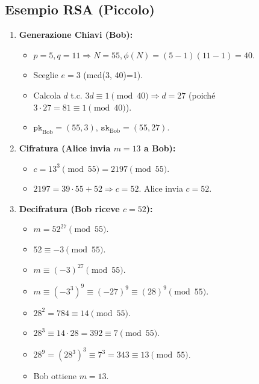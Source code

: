 \subsection{Esempio RSA (Piccolo)}
\begin{enumerate}
    \item \textbf{Generazione Chiavi (Bob):}
    \begin{itemize}
        \item $p=5, q=11 \Rightarrow N = 55, \phi(N) = (5-1)(11-1) = 40$.
        \item Sceglie $e=3$ (mcd(3, 40)=1).
        \item Calcola $d$ t.c. $3d \equiv 1 \pmod{40} \Rightarrow d=27$ (poiché $3 \cdot 27 = 81 \equiv 1 \pmod{40}$).
        \item $\texttt{pk}_{\text{Bob}} = (55, 3)$, $\texttt{sk}_{\text{Bob}} = (55, 27)$.
    \end{itemize}
    \item \textbf{Cifratura (Alice invia $m=13$ a Bob):}
    \begin{itemize}
        \item $c = 13^3 \pmod{55} = 2197 \pmod{55}$.
        \item $2197 = 39 \cdot 55 + 52 \Rightarrow c=52$. Alice invia $c=52$.
    \end{itemize}
    \item \textbf{Decifratura (Bob riceve $c=52$):}
    \begin{itemize}
        \item $m = 52^{27} \pmod{55}$.
        \item $52 \equiv -3 \pmod{55}$.
        \item $m \equiv (-3)^{27} \pmod{55}$.
        \item $m \equiv (-3^{3})^9 \equiv (-27)^9 \equiv (28)^9 \pmod{55}$.
        \item $28^2 = 784 \equiv 14 \pmod{55}$.
        \item $28^3 \equiv 14 \cdot 28 = 392 \equiv 7 \pmod{55}$.
        \item $28^9 = (28^3)^3 \equiv 7^3 = 343 \equiv 13 \pmod{55}$.
        \item Bob ottiene $m=13$.
    \end{itemize}
\end{enumerate}

